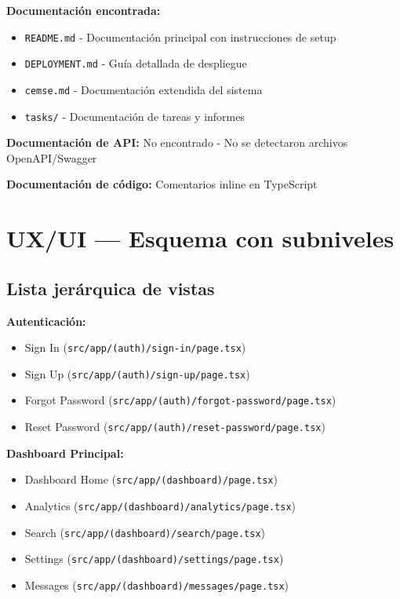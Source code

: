 \documentclass[12pt,a4paper]{article}
\begin{document}
\begin{enumerate}
\textbf{Documentación encontrada:}
\begin{itemize}
    \item \texttt{README.md} - Documentación principal con instrucciones de setup
    \item \texttt{DEPLOYMENT.md} - Guía detallada de despliegue
    \item \texttt{cemse.md} - Documentación extendida del sistema
    \item \texttt{tasks/} - Documentación de tareas y informes
\end{itemize}

\textbf{Documentación de API:} No encontrado - No se detectaron archivos OpenAPI/Swagger

\textbf{Documentación de código:} Comentarios inline en TypeScript

\section{UX/UI — Esquema con subniveles}

\subsection{Lista jerárquica de vistas}

\textbf{Autenticación:}
\begin{itemize}
    \item Sign In (\texttt{src/app/(auth)/sign-in/page.tsx})
    \item Sign Up (\texttt{src/app/(auth)/sign-up/page.tsx})
    \item Forgot Password (\texttt{src/app/(auth)/forgot-password/page.tsx})
    \item Reset Password (\texttt{src/app/(auth)/reset-password/page.tsx})
\end{itemize}

\textbf{Dashboard Principal:}
\begin{itemize}
    \item Dashboard Home (\texttt{src/app/(dashboard)/page.tsx})
    \item Analytics (\texttt{src/app/(dashboard)/analytics/page.tsx})
    \item Search (\texttt{src/app/(dashboard)/search/page.tsx})
    \item Settings (\texttt{src/app/(dashboard)/settings/page.tsx})
    \item Messages (\texttt{src/app/(dashboard)/messages/page.tsx})
\end{itemize}


\end{enumerate}
\end{document}
